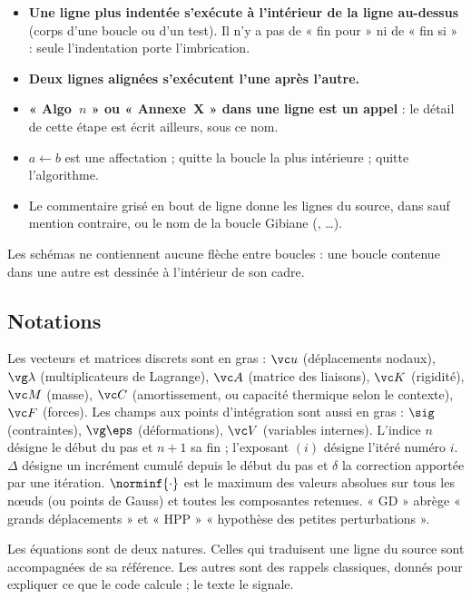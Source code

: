\begin{itemize}
\item \textbf{Une ligne plus indentée s'exécute à l'intérieur de la ligne au-dessus} (corps d'une boucle ou d'un test). Il n'y a pas de « fin pour » ni de « fin si » : seule l'indentation porte l'imbrication.
\item \textbf{Deux lignes alignées s'exécutent l'une après l'autre.}
\item \textbf{« Algo~$n$ » ou « Annexe~X » dans une ligne est un appel} : le détail de cette étape est écrit ailleurs, sous ce nom.
\item $a \gets b$ est une affectation ; \Sortir{} quitte la boucle la plus intérieure ; \Retourner{} quitte l'algorithme.
\item Le commentaire grisé en bout de ligne donne les lignes du source, dans  sauf mention contraire, ou le nom de la boucle Gibiane (, …).
\end{itemize}

Les schémas ne contiennent aucune flèche entre boucles : une boucle contenue dans une autre est dessinée à l'intérieur de son cadre.

\subsection{Notations}

Les vecteurs et matrices discrets sont en gras : $\vc u$ (déplacements nodaux), $\vg\lambda$ (multiplicateurs de Lagrange), $\vc A$ (matrice des liaisons), $\vc K$ (rigidité), $\vc M$ (masse), $\vc C$ (amortissement, ou capacité thermique selon le contexte), $\vc F$ (forces).
Les champs aux points d'intégration sont aussi en gras : $\sig$ (contraintes), $\vg\eps$ (déformations), $\vc V$ (variables internes).
L'indice $n$ désigne le début du pas et $n+1$ sa fin ; l'exposant $(i)$ désigne l'itéré numéro $i$.
$\Delta$ désigne un incrément cumulé depuis le début du pas et $\delta$ la correction apportée par une itération.
$\norminf{\cdot}$ est le maximum des valeurs absolues sur tous les nœuds (ou points de Gauss) et toutes les composantes retenues.
« GD » abrège « grands déplacements » et « HPP » « hypothèse des petites perturbations ».

Les équations sont de deux natures.
Celles qui traduisent une ligne du source sont accompagnées de sa référence.
Les autres sont des rappels classiques, donnés pour expliquer ce que le code calcule ; le texte le signale.

